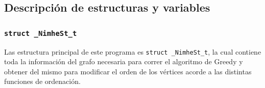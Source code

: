 \documentclass[11pt,a4paper]{article}
\theoremstyle{plain}
\begin{document}
	\subsection{Descripción de estructuras y variables}
	\label{sec:3.1}
	
		\subsubsection{\texttt{struct \_NimheSt\_t}}
	
Las estructura principal de este programa es \texttt{struct \_NimheSt\_t}, la cual contiene toda la información del grafo necesaria para correr el algoritmo de Greedy y obtener del mismo para modificar el orden de los vértices acorde a las distintas funciones de ordenación.\\
\end{document}
